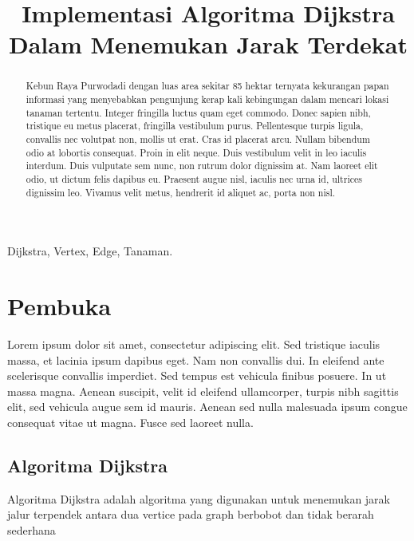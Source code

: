 \documentclass[conference]{IEEEtran}
\title{Implementasi Algoritma Dijkstra Dalam
Menemukan Jarak Terdekat}
\author{\IEEEauthorblockN{Reynaldo A. A. Putra}
\IEEEauthorblockA{\textit{School of Electrical Engineering and Informatics}\\
\textit{Institut Teknologi Bandung}\\
Bandung, Indonesia\\
Email: NIM@std.stei.itb.ac.id}
}
\begin{document}
\maketitle

\begin{abstract}
    Kebun Raya Purwodadi dengan luas area sekitar 85
hektar ternyata kekurangan papan informasi yang menyebabkan
pengunjung kerap kali kebingungan dalam mencari lokasi tanaman tertentu. Integer fringilla luctus quam eget commodo. Donec sapien nibh, tristique eu metus placerat, fringilla vestibulum purus. Pellentesque turpis ligula, convallis nec volutpat non, mollis ut erat. Cras id placerat arcu. Nullam bibendum odio at lobortis consequat. Proin in elit neque. Duis vestibulum velit in leo iaculis interdum. Duis vulputate sem nunc, non rutrum dolor dignissim at. Nam laoreet elit odio, ut dictum felis dapibus eu. Praesent augue nisl, iaculis nec urna id, ultrices dignissim leo. Vivamus velit metus, hendrerit id aliquet ac, porta non nisl.    
\end{abstract}

\begin{IEEEkeywords}
    Dijkstra, Vertex, Edge, Tanaman.
\end{IEEEkeywords}

\section{Pembuka}
Lorem ipsum dolor sit amet, consectetur adipiscing elit. Sed tristique iaculis massa, et lacinia ipsum dapibus eget. Nam non convallis dui. In eleifend ante scelerisque convallis imperdiet. Sed tempus est vehicula finibus posuere. In ut massa magna. Aenean suscipit, velit id eleifend ullamcorper, turpis nibh sagittis elit, sed vehicula augue sem id mauris. Aenean sed nulla malesuada ipsum congue consequat vitae ut magna. Fusce sed laoreet nulla.

\subsection{Algoritma Dijkstra}
Algoritma Dijkstra adalah algoritma yang digunakan untuk
menemukan jarak jalur terpendek antara dua vertice pada
graph berbobot dan tidak berarah sederhana \cite{he2022application}

\end{document}
